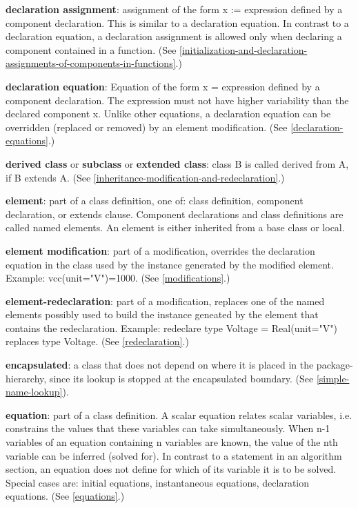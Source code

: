 \documentclass[10pt,a4paper]{report}
\begin{document}
\textbf{declaration assignment}: assignment of the form x := expression
defined by a component declaration. This is similar to a declaration
equation. In contrast to a declaration equation, a declaration
assignment is allowed only when declaring a component contained in a
function. (See \ref{initialization-and-declaration-assignments-of-components-in-functions}.)

\textbf{declaration equation}: Equation of the form x = expression
defined by a component declaration. The expression must not have higher
variability than the declared component x. Unlike other equations, a
declaration equation can be overridden (replaced or removed) by an
element modification. (See \ref{declaration-equations}.)

\textbf{derived class} or \textbf{subclass} or \textbf{extended class}:
class B is called derived from A, if B extends A. (See \ref{inheritance-modification-and-redeclaration}.)

\textbf{element}: part of a class definition, one of: class definition,
component declaration, or extends clause. Component declarations and
class definitions are called named elements. An element is either
inherited from a base class or local.

\textbf{element modification}: part of a modification, overrides the
declaration equation in the class used by the instance generated by the
modified element. Example: vcc(unit="V")=1000. (See \ref{modifications}.)

\textbf{element-redeclaration}: part of a modification, replaces one of
the named elements possibly used to build the instance geneated by the
element that contains the redeclaration. Example: redeclare type Voltage
= Real(unit="V") replaces type Voltage. (See \ref{redeclaration}.)

\textbf{encapsulated}: a class that does not depend on where it is
placed in the package-hierarchy, since its lookup is stopped at the
encapsulated boundary. (See \ref{simple-name-lookup}).

\textbf{equation}: part of a class definition. A scalar equation relates
scalar variables, i.e. constrains the values that these variables can
take simultaneously. When n-1 variables of an equation containing n
variables are known, the value of the nth variable can be inferred
(solved for). In contrast to a statement in an algorithm section, an
equation does not define for which of its variable it is to be solved.
Special cases are: initial equations, instantaneous equations,
declaration equations. (See \ref{equations}.)
\end{document}
